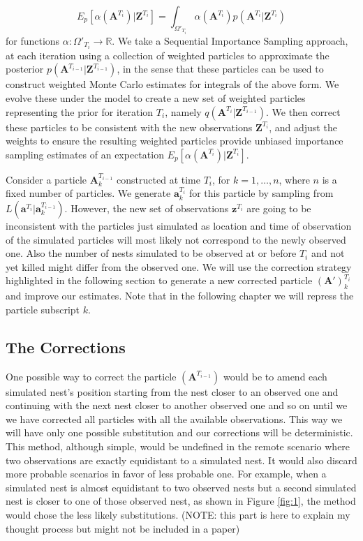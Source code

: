 \documentclass[11pt,a4paper]{article}
\renewcommand{\vec}[1]{\mathbf{#1}}
\begin{document}
\begin{equation*}
    E_p[\alpha(\vec{A}^{T_i}) | \vec{Z}^{T_i}] = \int_{\Omega'_{T_i}} \alpha(\vec{A}^{T_i}) p(\vec{A}^{T_i} | \vec{Z}^{T_i})
\end{equation*}
for functions $\alpha : \Omega'_{T_i} \rightarrow \mathbb{R}$.
We take a Sequential Importance Sampling approach, at each iteration using a collection of weighted particles to approximate the posterior $p(\vec{A}^{T_{i-1}} | \vec{Z}^{T_{i-1}})$, in the sense that these particles can be used to construct weighted Monte Carlo estimates for integrals of the above form. We evolve these under the model to create a new set of weighted particles representing the prior for iteration $T_i$, namely $q(\vec{A}^{T_i} | \vec{Z}^{T_{i-1}})$. We then correct these particles to be consistent with the new observations $\vec{Z}^{T_i}$, and adjust the weights to ensure the resulting weighted particles provide unbiased importance sampling estimates of an expectation $E_p[\alpha(\vec{A}^{T_i}) | \vec{Z}^{T_i}]$.

Consider a particle $\vec{A}_k^{T_{i-1}}$ constructed at time $T_i$, for $k = 1, \dots, n$, where $n$ is a fixed number of particles. We generate $\vec{a}^{T_{i}}_k$ for this particle by sampling from $L(\vec{a}^{T_i} | \vec{a}_k^{T_{i-1}})$. However, the new set of observations $\vec{z}^{T_i}$ are going to be inconsistent with the particles just simulated as location and time of observation of the simulated particles will most likely not correspond to the newly observed one. Also the number of nests simulated to be observed at or before $T_i$ and not yet killed might differ from the observed one. We will use the correction strategy highlighted in the following section to generate a new corrected particle $(\vec{A}')^{T_i}_k$ and improve our estimates. Note that in the following chapter we will repress the particle subscript $k$.



\subsection{The Corrections} \label{subsec:corrections}

One possible way to correct the particle $(\vec{A}^{T_{i-1}})$ would be to amend each simulated nest's position starting from the nest closer to an observed one and continuing with the next nest closer to another observed one and so on until we we have corrected all particles with all the available observations. This way we will have only one possible substitution and our corrections will be deterministic. This method, although simple, would be undefined in the remote scenario where two observations are exactly equidistant to a simulated nest. It would also discard more probable scenarios in favor of less probable one. For example, when a simulated nest is almost equidistant to two observed nests but a second simulated nest is closer to one of those observed nest, as shown in Figure \ref{fig:1}, the method would chose the less likely substitutions. (NOTE: this part is here to explain my thought process but might not be included in a paper)
\end{document}
